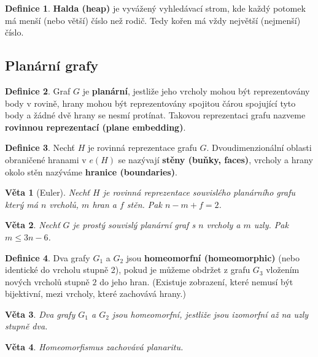 \documentclass[a4]{report}
\newtheorem{theorem}{Věta}
\theoremstyle{definition}
\newtheorem{definition}{Definice}[section]
\begin{document}
\begin{definition}
\textbf{Halda (heap)} je vyvážený vyhledávací strom, kde každý potomek má menší (nebo větší) číslo než rodič. Tedy kořen má vždy největší (nejmenší) číslo.
\end{definition}

\subsection{Planární grafy}

\begin{definition}
Graf $G$ je \textbf{planární}, jestliže jeho vrcholy mohou být reprezentovány body v rovině, hrany mohou být reprezentovány spojitou čárou spojující tyto body a žádné dvě hrany se nesmí protínat. Takovou reprezentaci grafu nazveme \textbf{rovinnou reprezentací (plane embedding)}.
\end{definition}

\begin{definition}
Nechť $H$ je rovinná reprezentace grafu $G$. Dvoudimenzionální oblasti obraničené hranami v $e(H)$ se nazývají \textbf{stěny (buňky, faces)}, vrcholy a hrany okolo stěn nazýváme \textbf{hranice (boundaries)}.
\end{definition}


\begin{theorem}[Euler]
Nechť $H$ je rovinná reprezentace souvislého planárního grafu který má $n$ vrcholů, $m$ hran a $f$ stěn. Pak $n - m + f = 2$.
\end{theorem}

\begin{theorem}
Nechť $G$ je prostý souvislý planární graf s $n$ vrcholy a $m$ uzly. Pak $m \leq 3n - 6$.
\end{theorem}

\begin{definition}
Dva grafy $G_1$ a $G_2$ jsou \textbf{homeomorfní (homeomorphic)} (nebo identické do vrcholu stupně 2), pokud je můžeme obdržet z grafu $G_3$ vložením nových vrcholů stupně $2$ do jeho hran. (Existuje zobrazení, které nemusí být bijektivní, mezi vrcholy, které zachovává hrany.)
\end{definition}

\begin{theorem}
Dva grafy $G_1$ a $G_2$ jsou homeomorfní, jestliže jsou izomorfní až na uzly stupně dva.
\end{theorem}

\begin{theorem}
Homeomorfismus zachovává planaritu.
\end{theorem}
\end{document}
